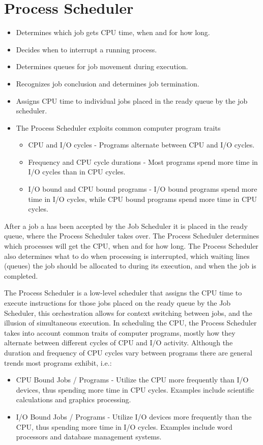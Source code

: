 \documentclass[12pt letter]{report}
\begin{document}
\section{Process Scheduler}
\begin{itemize}
  \item Determines which job gets CPU time, when and for how long.
  \item Decides when to interrupt a running process.
  \item Determines queues for job movement during execution.
  \item Recognizes job conclusion and determines job termination.
  \item Assigns CPU time to individual jobs placed in the ready queue
    by the job scheduler.
  \item The Process Scheduler exploits common computer program traits
    \begin{itemize}
      \item CPU and I/O cycles - Programs alternate between CPU and I/O cycles.
      \item Frequency and CPU cycle durations - Most programs spend
        more time in I/O cycles than in CPU cycles.
      \item I/O bound and CPU bound programs - I/O bound programs
        spend more time in I/O cycles, while CPU bound programs spend
        more time in CPU cycles.
    \end{itemize}
\end{itemize}

After a job a has been accepted by the Job Scheduler it is placed in
the ready queue, where the Process Scheduler takes over. The Process
Scheduler determines which processes will get the CPU, when and for
how long. The Process Scheduler also determines what to do when
processing is interrupted, which waiting lines (queues) the job
should be allocated to during its execution, and when the job is completed.

The Process Scheduler is a low-level scheduler that assigns the CPU
time to execute instructions for those jobs placed on the ready queue
by the Job Scheduler, this orchestration allows for context switching
between jobs, and the illusion of simultaneous execution. In
scheduling the CPU, the Process Scheduler takes into account common
traits of computer programs, mostly how they alternate between
different cycles of CPU and I/O activity. Although the duration and
frequency of CPU cycles vary between programs there are general
trends most programs exhibit, i.e.:
\begin{itemize}
  \item CPU Bound Jobs / Programs - Utilize the CPU more frequently
    than I/O devices, thus spending more time in CPU cycles. Examples
    include scientific calculations and graphics processing.
  \item I/O Bound Jobs / Programs - Utilize I/O devices more
    frequently than the CPU, thus spending more time in I/O cycles.
    Examples include word processors and database management systems.
\end{itemize}
\end{document}
